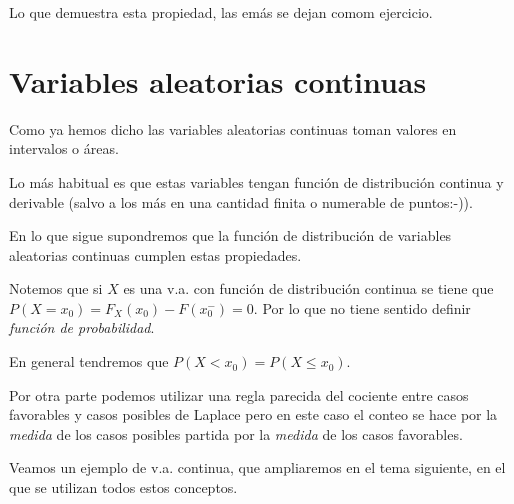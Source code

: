 \documentclass[
  letterpaper,
  DIV=11,
  numbers=noendperiod]{scrreprt}
\begin{document}
Lo que demuestra esta propiedad, las emás se dejan comom ejercicio.

\section{Variables aleatorias
continuas}\label{variables-aleatorias-continuas}

Como ya hemos dicho las variables aleatorias continuas toman valores en
intervalos o áreas.

Lo más habitual es que estas variables tengan función de distribución
continua y derivable (salvo a los más en una cantidad finita o numerable
de puntos:-)).

En lo que sigue supondremos que la función de distribución de variables
aleatorias continuas cumplen estas propiedades.

Notemos que si \(X\) es una v.a. con función de distribución continua se
tiene que \(P(X=x_0)=F_X(x_0)-F(x_0^{-})=0\). Por lo que no tiene
sentido definir \emph{función de probabilidad}.

En general tendremos que \(P(X<x_0)=P(X\leq x_0)\).

Por otra parte podemos utilizar una regla parecida del cociente entre
casos favorables y casos posibles de Laplace pero en este caso el conteo
se hace por la \emph{medida} de los casos posibles partida por la
\emph{medida} de los casos favorables.

Veamos un ejemplo de v.a. continua, que ampliaremos en el tema
siguiente, en el que se utilizan todos estos conceptos.
\end{document}
